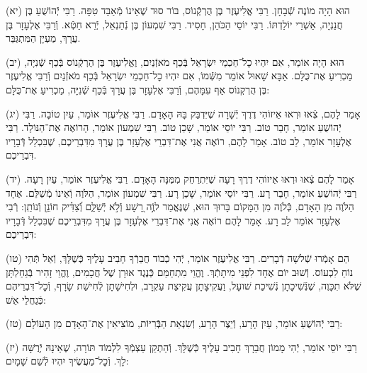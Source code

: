 \documentclass[twoside, openany, parskip=half, 11pt]{book}
\begin{document}
(יא)
הוּא הָיָה מוֹנֶה שְֿׁבָחָן.
רַבִּי אֱלִיעֶזֶר בֶּן הֻרְקְֿנוֹס, בּוֹר סוּד שֶׁאֵינוֹ מְֿאַבֵּד טִפָּה.
רַבִּי יְֿהוֹשֻׁעַ בֶּן חֲנַנְיָה, אַשְׁרֵי יוֹלַדְתּוֹ.
רַבִּי יוֹסֵי הַכֹּהֵן, חָסִיד.
רַבִּי שִׁמְעוֹן בֶּן נְֿתַנְאֵל, יְֿרֵא חֵטְֿא.
וְֿרַבִּי אֶלְעָזָר בֶּן עֲרָךְ, מַעְיָן הַמִּתְגַּבֵּר.

(יב)
הוּא הָיָה אוֹמֵר, אִם יִהְיוּ כׇל־חַכְמֵי יִשְׂרָאֵל בְּֿכַף מֹאזְֿנַיִם, וֶאֱלִיעֶזֶר בֶּן הֻרְקְֿנוֹס בְּֿכַף שְֿׁנִיָּה, מַכְרִיעַ אֶת־כֻּלָּם. אַבָּא שָׁאוּל אוֹמֵר מִשְּֿׁמוֹ, אִם יִהְיוּ כׇל־חַכְמֵי יִשְׂרָאֵל בְּֿכַף מֹאזְֿנַיִם וְֿרַבִּי אֱלִיעֶזֶר בֶּן הֻרְקְנוֹס אַף עִמָּהֶם, וְֿרַבִּי אֶלְעָזָר בֶּן עֲרָךְ בְּֿכַף שְֿׁנִיָּה, מַכְרִיעַ אֶת־כֻּלָּם:

(יג)
אָמַר לָהֶם, צְֿאוּ וּרְאוּ אֵיזוֹהִי דֶרֶךְ יְֿשָׁרָה שֶׁיִּדְבַּק בָּהּ הָאָדָם.
רַבִּי אֱלִיעֶזֶר אוֹמֵר, עַיִן טוֹבָה.
רַבִּי יְֿהוֹשֻׁעַ אוֹמֵר, חָבֵר טוֹב.
רַבִּי יוֹסֵי אוֹמֵר, שָׁכֵן טוֹב.
רַבִּי שִׁמְעוֹן אוֹמֵר, הָרוֹאֶה אֶת־הַנּוֹלָד.
רַבִּי אֶלְעָזָר אוֹמֵר, לֵב טוֹב.
אָמַר לָהֶם, רוֹאֶה אֲנִי אֶת־דִּבְרֵי אֶלְעָזָר בֶּן עֲרָךְ מִדִּבְרֵיכֶם, שֶׁבִּכְלַל דְּֿבָרָיו דִּבְרֵיכֶם.

(יד)
אָמַר לָהֶם צְֿאוּ וּרְאוּ אֵיזוֹהִי דֶרֶךְ רָעָה שֶׁיִּתְרַחֵק מִמֶּנָּה הָאָדָם.
רַבִּי אֱלִיעֶזֶר אוֹמֵר, עַיִן רָעָה.
רַבִּי יְֿהוֹשֻׁעַ אוֹמֵר, חָבֵר רָע.
רַבִּי יוֹסֵי אוֹמֵר, שָׁכֵן רָע.
רַבִּי שִׁמְעוֹן אוֹמֵר, הַלֹּוֶה וְֿאֵינוֹ מְֿשַׁלֵּם. אֶחָד הַלֹּוֶה מִן הָאָדָם, כְּֿלֹוֶה מִן הַמָּקוֹם בָּרוּךְ הוּא, שֶׁנֶּאֱמַר לוֶֹ֣ה רָ֭שָׁע וְֿלֹ֣א יְֿשַׁלֵּ֑ם וְֿ֝צַדִּ֗יק חוֹנֵ֥ן וְֿנוֹתֵֽן: רְֿבִי אֶלְעָזָר אוֹמֵר לֵב רָע. אָמַר לָהֶם רוֹאֶה אֲנִי אֶת־דִּבְרֵי אֶלְעָזָר בֶּן עֲרָךְ מִדִּבְרֵיכֶם שֶׁבִּכְלַל דְּֿבָרָיו דִּבְרֵיכֶם:

(טו)
הֵם אָמְֿרוּ שְֿׁלשָׁה דְֿבָרִים. רַבִּי אֱלִיעֶזֶר אוֹמֵר, יְֿהִי כְֿבוֹד חֲבֵרְֿךָ חָבִיב עָלֶיךָ כְּֿשֶׁלָּךְ, וְֿאַל תְּֿהִי נוֹחַ לִכְעוֹס. וְֿשׁוּב יוֹם אֶחָד לִפְנֵי מִיתָתְֿךְ. וֶהֱוֵי מִתְחַמֵּם כְּֿנֶגֶד אוּרָן שֶׁל חֲכָמִים, וֶהֱוֵי זָהִיר בְּֿגַחַלְתָּן שֶׁלֹּא תִכָּוֶה, שֶׁנְּֿשִׁיכָתָן נְֿשִׁיכַת שׁוּעָל, וַעֲקִיצָתָן עֲקִיצַת עַקְרָב, וּלְחִישָׁתָן לְֿחִישַׁת שָׂרָף, וְֿכׇל־דִּבְרֵיהֶם כְּֿגַחֲלֵי אֵשׁ:

(טז)
רַבִּי יְֿהוֹשֻׁעַ אוֹמֵר, עַיִן הָרָע, וְֿיֵצֶר הָרָע, וְֿשִׂנְאַת הַבְּֿרִיּוֹת, מוֹצִיאִין אֶת־הָאָדָם מִן הָעוֹלָם:

(יז) רַבִּי יוֹסֵי אוֹמֵר, יְֿהִי מָמוֹן חֲבֵרָךְ חָבִיב עָלֶיךָ כְּֿשֶׁלָּךְ. וְֿהַתְקֵן עַצְמְֿךָ לִלְמוֹד תּוֹרָה, שֶׁאֵינָהּ יְֿרֻשָּׁה לָךְ. וְֿכׇל־מַעֲשֶׂיךָ יִהְיוּ לְֿשֵׁם שָׁמָיִם:
\end{document}
